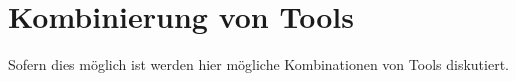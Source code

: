 \section{Kombinierung von Tools}\label{kombinierung}

Sofern dies möglich ist werden hier mögliche Kombinationen von Tools diskutiert.
